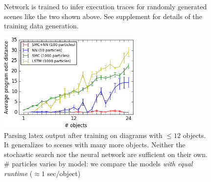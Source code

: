\documentclass{article}
\begin{document}
\begin{figure}[H]\centering
  \begin{minipage}{6cm}
    \begin{minipage}[t]{3cm}\end{minipage}%
    \begin{minipage}[t]{3cm}\end{minipage}
    \caption{Network is trained to infer execution traces for randomly generated scenes like the two shown above. See supplement for details of the training data generation.}\label{trainingData}
  \end{minipage}\hfill%
  \begin{minipage}{7.5cm}\centering
    \includegraphics[width = 7cm]{figures/editDistanceRecurrent.png}
      \caption{Parsing latex output after training on diagrams with $\leq 12$ objects. It generalizes to scenes with many more objects. Neither the stochastic search nor the neural network are sufficient on their own. \# particles varies by model: we compare the models \emph{with equal runtime} ($\approx 1$ sec/object)}\label{syntheticResults}
    \end{minipage}
  
  \end{figure}
\end{document}
